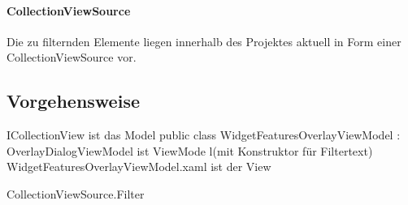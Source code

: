 \paragraph{CollectionViewSource}
Die zu filternden Elemente liegen innerhalb des Projektes aktuell in Form einer CollectionViewSource vor.
\cite{dotnetbot.}

\subsection {Vorgehensweise}

ICollectionView ist das Model
public class WidgetFeaturesOverlayViewModel : OverlayDialogViewModel ist ViewMode l(mit Konstruktor für Filtertext)
WidgetFeaturesOverlayViewModel.xaml ist der View


CollectionViewSource.Filter
\cite{dotnetbot.b}










